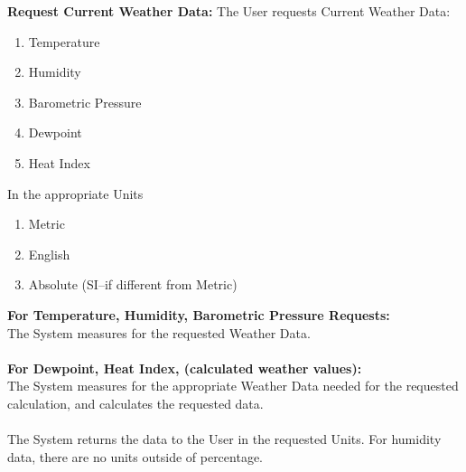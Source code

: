 \documentclass[letterpaper]{article}
\begin{document}
\noindent
\textbf{Request Current Weather Data:  }The User requests Current
Weather Data:
\begin{enumerate}
\item Temperature
\item Humidity
\item Barometric Pressure
\item Dewpoint
\item Heat Index
\end{enumerate}
In the appropriate Units
\begin{enumerate}
\item Metric
\item English
\item Absolute (SI--if different from Metric)
\end{enumerate}
\textbf{For Temperature, Humidity, Barometric Pressure Requests: }\\
The System measures for the requested
Weather Data.\\\\
\textbf{For Dewpoint, Heat Index, (calculated weather values):  }\\
The System measures for the appropriate Weather Data needed for the
requested calculation, and calculates the requested data.\\\\
The System returns the data to the User in the requested Units.  For
humidity data, there are no units outside of percentage.
\end{document}
